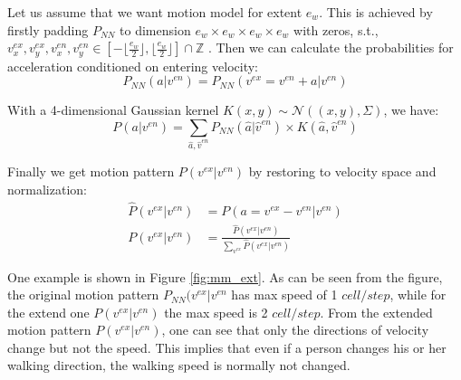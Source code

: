 Let us assume that we want motion model for extent $e_w$. This is achieved by firstly padding $P_{NN}$ to dimension $e_w \times e_w \times e_w \times e_w$ with zeros, s.t., $v^{ex}_x, v^{ex}_y,v^{en}_x, v^{en}_y \in [-\lfloor \frac{e_w}{2} \rfloor, \lfloor \frac{e_w}{2} \rfloor] \cap \mathbb{Z}$ . Then we can calculate the probabilities for acceleration conditioned on entering velocity:
\begin{equation}
P_{NN}(a|v^{en}) = P_{NN}(v^{ex}=v^{en}+a|v^{en}) \label{eq:mm_2}
\end{equation}

With a 4-dimensional Gaussian kernel $K(x, y) \sim \mathcal{N}((x,y), \Sigma)$, we have:
\begin{equation}
P(a|v^{en}) = \sum_{\hat{a}, \hat{v}^{en}}P_{NN}(\hat{a}|\hat{v}^{en})\times K(\hat{a}, \hat{v}^{en}) \label{eq:mm_3} 
\end{equation}

Finally we get motion pattern $P(v^{ex}|v^{en})$ by restoring to velocity space and normalization:
\begin{align}
\hat{P}(v^{ex}|v^{en}) &= P(a=v^{ex}-v^{en}|v^{en}) \\
P(v^{ex}|v^{en}) &= \frac{\hat{P}(v^{ex}|v^{en})}{\sum_{v^{ex}}\hat{P}(v^{ex}|v^{en})} \label{eq:mm_4}
\end{align}

One example is shown in Figure \ref{fig:mm_ext}. As can be seen from the figure, the original motion pattern $P_{NN}(v^{ex}|v^{en}$ has max speed of 1 $cell/step$, while for the extend one $P(v^{ex}|v^{en})$ the max speed is 2 $cell/step$. From the extended motion pattern $P(v^{ex}|v^{en})$, one can see that only the directions of velocity change but not the speed. This implies that even if a person changes his or her walking direction, the walking speed is normally not changed.

